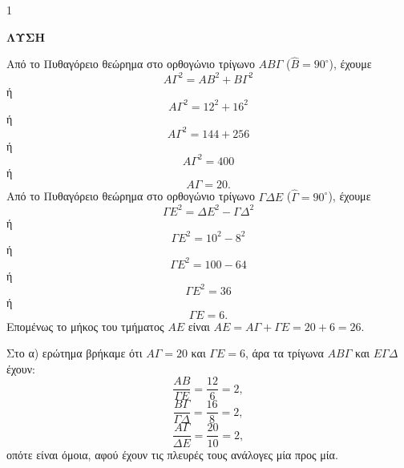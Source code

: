 \begin{ylh}{1}
    \item [Ύλη από εικόνα]
\end{ylh}
\textbf{ΛΥΣΗ}
\begin{alist}
    \item [α)] Από το Πυθαγόρειο θεώρημα στο ορθογώνιο τρίγωνο $ΑΒΓ$ ($\hat{Β} = 90^\circ$), έχουμε
    \[ ΑΓ^2 = ΑΒ^2 + ΒΓ^2 \]
    ή
    \[ ΑΓ^2 = 12^2 + 16^2 \]
    ή
    \[ ΑΓ^2 = 144 + 256 \]
    ή
    \[ ΑΓ^2 = 400 \]
    ή
    \[ ΑΓ = 20. \]
    Από το Πυθαγόρειο θεώρημα στο ορθογώνιο τρίγωνο $ΓΔΕ$ ($\hat{Γ} = 90^\circ$), έχουμε
    \[ ΓΕ^2 = ΔΕ^2 - ΓΔ^2 \]
    ή
    \[ ΓΕ^2 = 10^2 - 8^2 \]
    ή
    \[ ΓΕ^2 = 100 - 64 \]
    ή
    \[ ΓΕ^2 = 36 \]
    ή
    \[ ΓΕ = 6. \]
    Επομένως το μήκος του τμήματος $ΑΕ$ είναι $ΑΕ = ΑΓ + ΓΕ = 20 + 6 = 26$.

    \item [β)] Στο α) ερώτημα βρήκαμε ότι $ΑΓ = 20$ και $ΓΕ = 6$, άρα τα τρίγωνα $ΑΒΓ$ και $ΕΓΔ$ έχουν:
    \[ \frac{ΑΒ}{ΓΕ} = \frac{12}{6} = 2, \]
    \[ \frac{ΒΓ}{ΓΔ} = \frac{16}{8} = 2, \]
    \[ \frac{ΑΓ}{ΔΕ} = \frac{20}{10} = 2, \]
    οπότε είναι όμοια, αφού έχουν τις πλευρές τους ανάλογες μία προς μία.
    \begin{figure} %
\end{figure}
\end{alist}
